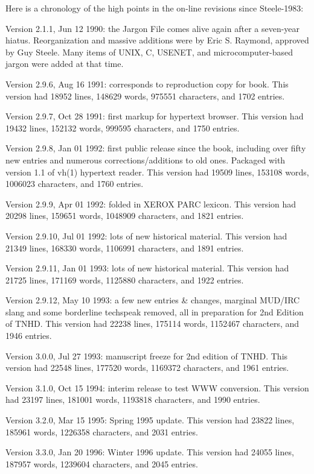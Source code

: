 Here is a chronology of the high points in the on-line revisions since Steele-1983:

Version 2.1.1, Jun 12 1990: the Jargon File comes alive again after a seven-year hiatus. Reorganization and massive additions were by Eric
S. Raymond, approved by Guy Steele. Many items of UNIX, C, USENET, and microcomputer-based jargon were added at that time.

Version 2.9.6, Aug 16 1991: corresponds to reproduction copy for book. This version had 18952 lines, 148629 words, 975551 characters, and
1702 entries.

Version 2.9.7, Oct 28 1991: first markup for hypertext browser. This version had 19432 lines, 152132 words, 999595 characters, and 1750
entries.

Version 2.9.8, Jan 01 1992: first public release since the book, including over fifty new entries and numerous corrections/additions to old
ones. Packaged with version 1.1 of vh(1) hypertext reader. This version had 19509 lines, 153108 words, 1006023 characters, and 1760
entries.

Version 2.9.9, Apr 01 1992: folded in XEROX PARC lexicon. This version had 20298 lines, 159651 words, 1048909 characters, and 1821 entries.

Version 2.9.10, Jul 01 1992: lots of new historical material. This version had 21349 lines, 168330 words, 1106991 characters, and 1891
entries.

Version 2.9.11, Jan 01 1993: lots of new historical material. This version had 21725 lines, 171169 words, 1125880 characters, and 1922
entries.

Version 2.9.12, May 10 1993: a few new entries \& changes, marginal MUD/IRC slang and some borderline techspeak removed, all in preparation
for 2nd Edition of TNHD. This version had 22238 lines, 175114 words, 1152467 characters, and 1946 entries.

Version 3.0.0, Jul 27 1993: manuscript freeze for 2nd edition of TNHD. This version had 22548 lines, 177520 words, 1169372 characters, and
1961 entries.

Version 3.1.0, Oct 15 1994: interim release to test WWW conversion. This version had 23197 lines, 181001 words, 1193818 characters, and
1990 entries.

Version 3.2.0, Mar 15 1995: Spring 1995 update. This version had 23822 lines, 185961 words, 1226358 characters, and 2031 entries.

Version 3.3.0, Jan 20 1996: Winter 1996 update. This version had 24055 lines, 187957 words, 1239604 characters, and 2045 entries.

